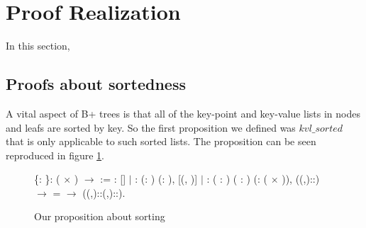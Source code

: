 \section{Proof Realization}
\label{sec:ProofRealization}
In this section, 

\subsection{Proofs about sortedness}
A vital aspect of B+ trees is that all of the key-point and key-value lists in nodes and leafs are sorted by key. So the first proposition we defined was $kvl\_sorted$ that is only applicable to such sorted lists. The proposition can be seen reproduced in figure \ref{fig:kvl_sorted}.

\begin{figure}
  \begin{coqdoccode}
  \coqdocnoindent
    \{: \}:  ( \ensuremath{\times} ) \ensuremath{\rightarrow}  :=\coqdoceol
  \coqdocindent{2.00em}
  :  []\coqdoceol
  \coqdocindent{1.00em}
  \ensuremath{|} : \coqdockw{\ensuremath{\forall}} (: ) (: ), \coqdoceol
  \coqdocindent{8.00em}
   [(, )]\coqdoceol
  \coqdocindent{1.00em}
  \ensuremath{|} : \coqdockw{\ensuremath{\forall}} ( : ) ( : ) (:  ( \ensuremath{\times} )), \coqdoceol
  \coqdocindent{8.00em}
   ((,)::) \ensuremath{\rightarrow} \coqdoceol
  \coqdocindent{8.00em}
     =  \ensuremath{\rightarrow}\coqdoceol
  \coqdocindent{8.00em}
   ((,)::(,)::).\coqdoceol
  \end{coqdoccode}
  \caption{Our proposition about sorting}
  \label{fig:kvl_sorted}
\end{figure}

